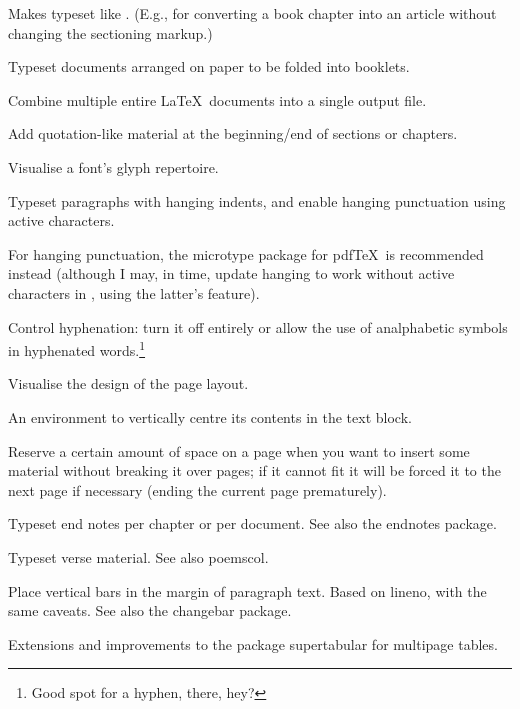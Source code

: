 \documentclass[final]{ltugboat}
\begin{document}
\enlargethispage{-5pc}
\begin{description}[font=\normalfont\sffamily]
\item [anonchap] Makes  typeset like . (E.g., for converting a book chapter into an article without changing the sectioning markup.)

\item [booklet]  Typeset documents arranged on paper to be folded into booklets.
\item [combine]  Combine multiple entire \LaTeX\ documents into a single output file.

\item [epigraph] Add quotation-like material at the beginning\slash{}end of sections or chapters.

\item [fonttable] Visualise a font's glyph repertoire.

\item [hanging]  Typeset paragraphs with hanging indents, and enable hanging punctuation using active characters.

For hanging punctuation, the \textsf{microtype} package for pdf\/\TeX\ is recommended instead (although I may, in time, update \textsf{hanging} to work without active characters in \XeTeX, using the latter's  feature).
\item [hyphenat] Control hyphenation: turn it off entirely or allow the use of analphabetic symbols in hyphenated words.\footnote{Good spot for a hyphen, there, hey?}
\item [layouts] Visualise the design of the page layout.
\item [midpage] An environment to vertically centre its contents in the text block.
\item [needspace] Reserve a certain amount of space on a page when you want to insert some material without breaking it over pages; if it cannot fit it will be forced it to the next page if necessary (ending the current page prematurely).
\item [pagenote] Typeset end notes per chapter or per document. See also the \textsf{endnotes} package.
\item [verse] Typeset verse material. See also \textsf{poemscol}.
\item [vertbars] Place vertical bars in the margin of paragraph text. Based on \textsf{lineno}, with the same caveats. See also the \textsf{changebar} package.
\item [xtab] Extensions and improvements to the package \textsf{supertabular} for multipage tables.
\end{description}
\end{document}

